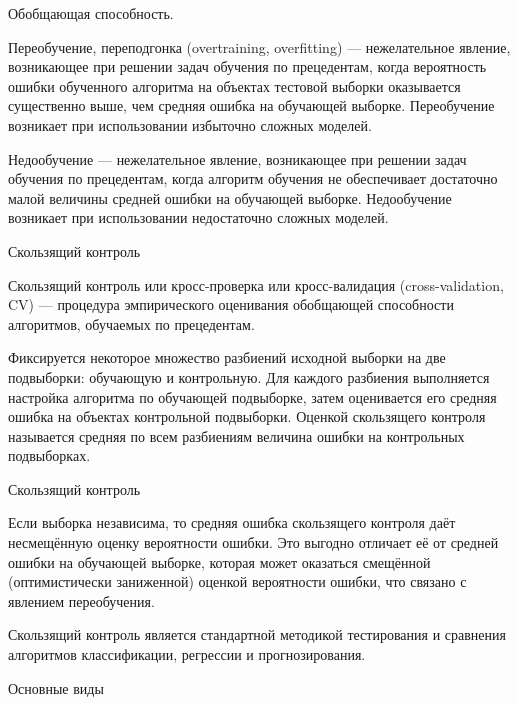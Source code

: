 \documentclass{beamer}
\begin{document}
\begin{frame}{Обобщающая способность.}

Переобучение, переподгонка (overtraining, overfitting) — нежелательное явление, возникающее при решении задач обучения по прецедентам, когда вероятность ошибки обученного алгоритма на объектах тестовой выборки оказывается существенно выше, чем средняя ошибка на обучающей выборке. Переобучение возникает при использовании избыточно сложных моделей.

Недообучение — нежелательное явление, возникающее при решении задач обучения по прецедентам, когда алгоритм обучения не обеспечивает достаточно малой величины средней ошибки на обучающей выборке. Недообучение возникает при использовании недостаточно сложных моделей. 

\end{frame}

\begin{frame}{Скользящий контроль}

Скользящий контроль или кросс-проверка или кросс-валидация (cross-validation, CV) — процедура эмпирического оценивания обобщающей способности алгоритмов, 
обучаемых по прецедентам.

Фиксируется некоторое множество разбиений исходной выборки на две подвыборки: обучающую и контрольную. Для каждого разбиения выполняется 
настройка алгоритма по обучающей подвыборке, затем оценивается его средняя ошибка на объектах контрольной подвыборки.
Оценкой скользящего контроля называется средняя по всем разбиениям величина ошибки на контрольных подвыборках.

\end{frame}

\begin{frame}{Скользящий контроль}

Если выборка независима, то средняя ошибка скользящего контроля даёт несмещённую оценку вероятности ошибки. 
Это выгодно отличает её от средней ошибки на обучающей выборке, которая может оказаться смещённой 
(оптимистически заниженной) оценкой вероятности ошибки, что связано с явлением переобучения.

Скользящий контроль является стандартной методикой тестирования и сравнения алгоритмов классификации, регрессии и прогнозирования. 

\end{frame}


\begin{frame}{Основные виды}

\end{frame}
\end{document}
